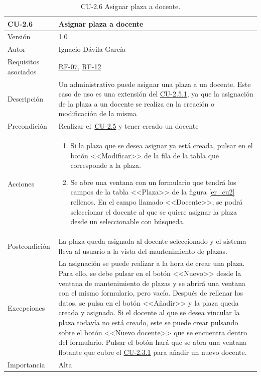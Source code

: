 \begin{table}[p]
	\centering
	\begin{tabularx}{\linewidth}{ p{} p{} }
		\toprule
		\textbf{CU-2.6}    & \textbf{Asignar plaza a docente}\\
		\toprule
		{\small Versión}              & 1.0    \\
		{\small Autor}                & Ignacio Dávila García \\
		{\small Requisitos asociados} & \hyperref[itm:RF7]{RF-07}, \hyperref[itm:RF12]{RF-12} \\
		{\small Descripción}          & Un administrativo puede asignar una plaza a un docente. Este caso de uso es una extensión del \hyperref[table:CU-2_5_1]{CU-2.5.1}, ya que la asignación de la plaza a un docente se realiza en la creación o modificación de la misma \\
		{\small Precondición}         & Realizar el~\hyperref[table:CU-2_5]{CU-2.5} y tener creado un docente \\
		{\small Acciones}             &
		\begin{enumerate}
			\def\labelenumi{\arabic{enumi}.}
			\tightlist
			\item Si la plaza que se desea asignar ya está creada, pulsar en el botón <<Modificar>> de la fila de la tabla que corresponde a la plaza.
			\item Se abre una ventana con un formulario que tendrá los campos de la tabla <<Plaza>> de la figura \ref{er_cu2} rellenos. En el campo llamado <<Docente>>, se podrá seleccionar el docente al que se quiere asignar la plaza desde un seleccionable con búsqueda.
		\end{enumerate}\\
		{\small Postcondición}        & La plaza queda asignada al docente seleccionado y el sistema lleva al usuario a la vista del mantenimiento de plazas. \\
		{\small Excepciones}          & La asignación se puede realizar a la hora de crear una plaza. Para ello, se debe pulsar en el botón <<Nuevo>> desde la ventana de mantenimiento de plazas y se abrirá una ventana con el mismo formulario, pero vacío. Después de rellenar los datos, se pulsa en el botón <<Añadir>> y la plaza queda creada y asignada.
		Si el docente al que se desea vincular la plaza todavía no está creado, este se puede crear pulsando sobre el botón <<Nuevo docente>> que se encuentra dentro del formulario. Pulsar el botón hará que se abra una ventana flotante que cubre el \hyperref[table:CU-2_3_1]{CU-2.3.1} para añadir un nuevo docente.\\
		{\small Importancia}          & Alta \\
		\bottomrule
	\end{tabularx}
	\caption{CU-2.6 Asignar plaza a docente.}\label{table:CU-2_6}
\end{table}
\FloatBarrier


